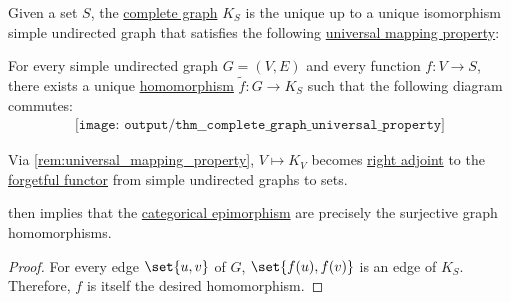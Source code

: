 \begin{theorem}\label{thm:complete_graph_universal_property}
  Given a set \( S \), the \hyperref[def:complete_graph]{complete graph} \( K_S \) is the unique up to a unique isomorphism simple undirected graph that satisfies the following \hyperref[rem:universal_mapping_property]{universal mapping property}:
  \begin{displayquote}
    For every simple undirected graph \( G = (V, E) \) and every function \( f: V \to S \), there exists a unique \hyperref[def:undirected_graph/homomorphism]{homomorphism} \( \widetilde{f}: G \to K_S \) such that the following diagram commutes:
    \begin{equation}\label{eq:thm:complete_graph_universal_property/diagram}
      \begin{aligned}
        \texttt{[image: output/thm\_\_complete\_graph\_universal\_property]}
      \end{aligned}
    \end{equation}
  \end{displayquote}
\end{theorem}
\begin{comments}
  \item Via \cref{rem:universal_mapping_property}, \( V \mapsto K_V \) becomes \hyperref[def:category_adjunction]{right adjoint} to the \hyperref[def:concrete_category]{forgetful functor} from simple undirected graphs to sets.

   then implies that the \hyperref[def:morphism_invertibility/right_cancellative]{categorical epimorphism} are precisely the surjective graph homomorphisms.
\end{comments}
\begin{proof}
  For every edge \( \set{ u, v } \) of \( G \), \( \set{ f(u), f(v) } \) is an edge of \( K_S \). Therefore, \( f \) is itself the desired homomorphism.
\end{proof}

